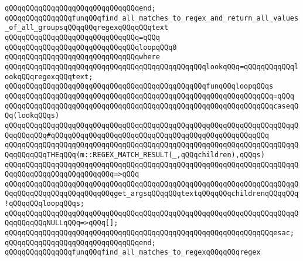 \verb|qQQqqQQqqQQqqQQqqQQqqQQqqQQqqQQqend;|\newline
\newline
\newline
\verb|qQQqqQQqqQQqqQQqfunqQQqfind_all_matches_to_regex_and_return_all_values_of_all_groupsqQQqqQQqregexqQQqqQQqtext|\newline
\verb|qQQqqQQqqQQqqQQqqQQqqQQqqQQqqQQq=qQQq|\newline
\verb|qQQqqQQqqQQqqQQqqQQqqQQqqQQqqQQqloopqQQq0|\newline
\verb|qQQqqQQqqQQqqQQqqQQqqQQqqQQqqQQqwhere|\newline
\verb|qQQqqQQqqQQqqQQqqQQqqQQqqQQqqQQqqQQqqQQqqQQqqQQqlookqQQq=qQQqqQQqqQQqlookqQQqregexqQQqtext;|\newline
\newline
\verb|qQQqqQQqqQQqqQQqqQQqqQQqqQQqqQQqqQQqqQQqqQQqqQQqfunqQQqloopqQQqs|\newline
\verb|qQQqqQQqqQQqqQQqqQQqqQQqqQQqqQQqqQQqqQQqqQQqqQQqqQQqqQQqqQQqqQQq=qQQq|\newline
\verb|qQQqqQQqqQQqqQQqqQQqqQQqqQQqqQQqqQQqqQQqqQQqqQQqqQQqqQQqqQQqqQQqcaseqQQq(lookqQQqs)|\newline
\verb|qQQqqQQqqQQqqQQqqQQqqQQqqQQqqQQqqQQqqQQqqQQqqQQqqQQqqQQqqQQqqQQqqQQqqQQqqQQqqQQq#qQQqqQQqqQQqqQQqqQQqqQQqqQQqqQQqqQQqqQQqqQQqqQQqqQQq|\newline
\verb|qQQqqQQqqQQqqQQqqQQqqQQqqQQqqQQqqQQqqQQqqQQqqQQqqQQqqQQqqQQqqQQqqQQqqQQqqQQqqQQqTHEqQQq(m::REGEX_MATCH_RESULT(_,qQQqchildren),qQQqs)|\newline
\verb|qQQqqQQqqQQqqQQqqQQqqQQqqQQqqQQqqQQqqQQqqQQqqQQqqQQqqQQqqQQqqQQqqQQqqQQqqQQqqQQqqQQqqQQqqQQqqQQq=>qQQq|\newline
\verb|qQQqqQQqqQQqqQQqqQQqqQQqqQQqqQQqqQQqqQQqqQQqqQQqqQQqqQQqqQQqqQQqqQQqqQQqqQQqqQQqqQQqqQQqqQQqqQQqget_argsqQQqqQQqtextqQQqqQQqchildrenqQQqqQQq!qQQqqQQqloopqQQqs;|\newline
\newline
\verb|qQQqqQQqqQQqqQQqqQQqqQQqqQQqqQQqqQQqqQQqqQQqqQQqqQQqqQQqqQQqqQQqqQQqqQQqqQQqqQQqNULLqQQq=>qQQq[];|\newline
\verb|qQQqqQQqqQQqqQQqqQQqqQQqqQQqqQQqqQQqqQQqqQQqqQQqqQQqqQQqqQQqqQQqesac;|\newline
\verb|qQQqqQQqqQQqqQQqqQQqqQQqqQQqqQQqend;|\newline
\newline
\newline
\verb|qQQqqQQqqQQqqQQqfunqQQqfind_all_matches_to_regexqQQqqQQqregex|\newline
